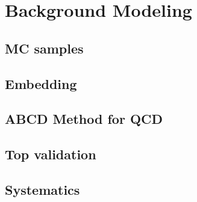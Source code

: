 \section{Background Modeling}

\subsection{MC samples}
\subsection{Embedding}
\subsection{ABCD Method for QCD}
\subsection{Top validation}
\subsection{Systematics}

